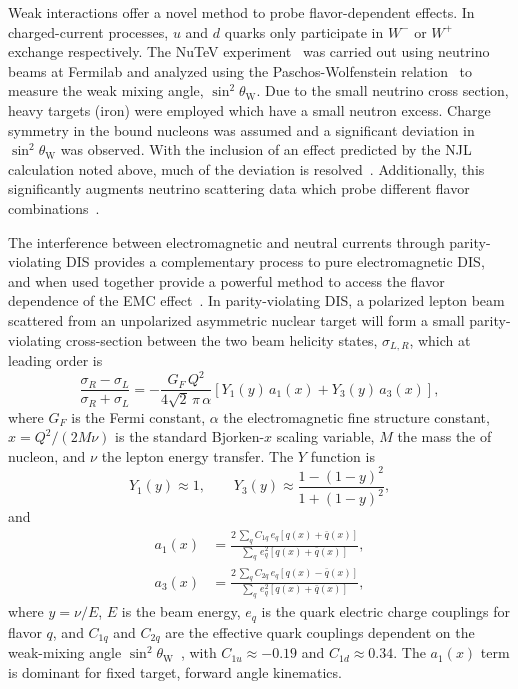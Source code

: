 Weak interactions offer a novel method to probe flavor-dependent effects.  In charged-current processes, $u$ and $d$ quarks only participate in $W^-$ or $W^+$ exchange respectively. The NuTeV experiment~\cite{Zeller:2001hh} was carried out using neutrino beams at Fermilab and analyzed using the Paschos-Wolfenstein relation~\cite{Paschos:1972kj} to measure the weak mixing angle, $\sin^2\theta_\mathrm{W}$.  Due to the small neutrino cross section, heavy targets (iron) were employed which have a small neutron excess.  Charge symmetry in the bound nucleons was assumed and a significant deviation in $\sin^2\theta_\mathrm{W}$ was observed.  With the inclusion of an effect predicted by the NJL calculation noted above, much of the deviation is resolved~\cite{Cloet:2009qs,Bentz:2009yy}.  Additionally, this significantly augments neutrino scattering data which probe different flavor combinations~\cite{Schienbein:2009kk}.

%
The interference between electromagnetic and neutral currents through parity-violating DIS provides a complementary process to pure electromagnetic DIS, and when used together provide a powerful method to access the flavor dependence of the EMC effect~\cite{Cloet:2012td}. In parity-violating DIS, a polarized lepton beam scattered from an unpolarized asymmetric nuclear target will form a small parity-violating cross-section between the two beam helicity states, $\sigma_{L,R}$, which at leading order is 
%
\begin{equation}
\frac{ \sigma_R - \sigma_L }{\sigma_R + \sigma_L} = -\frac{G_F\,Q^2}{4 \sqrt{2}\, \pi\, \alpha} 
\left[ Y_1(y)\,a_1(x) + Y_3(y)\,a_3(x) \right],
\label{eq:phy:apv}
\end{equation}
%
where $G_F$ is the Fermi constant, $\alpha$ the electromagnetic fine structure constant, $x = Q^2/(2M\nu)$ is the standard Bjorken-$x$ scaling variable, $M$ the mass the of nucleon, and $\nu$ the lepton energy transfer.  The $Y$ function is
%
\begin{equation}
Y_1(y) \approx 1, \qquad Y_3(y) \approx \frac{1 - (1-y)^2}{1 + (1-y)^2},
\end{equation}
%
and
%
\begin{align}
a_1(x) &= \frac{2\,\sum_q C_{1q}\, e_q\left[q(x) + \bar{q}(x)\right]}
{\sum_q\, e_q^2\left[q(x) + \bar{q}(x)\right]}, \\
a_3(x) &= \frac{2\,\sum_q C_{2q}\, e_q\left[q(x) - \bar{q}(x)\right]}
{\sum_q\, e_q^2\left[q(x) + \bar{q}(x)\right]},
\end{align}
%
where $y=\nu/E$, $E$ is the beam energy, $e_q$ is the quark electric charge couplings for flavor $q$, and $C_{1q}$ and $C_{2q}$ are the effective quark couplings dependent on the weak-mixing angle $\sin^2\theta_\mathrm{W}$~\cite{Patrignani:2016xqp}, with $C_{1u} \approx -0.19$ and $C_{1d} \approx 0.34$. The $a_1(x)$ term is dominant for fixed target, forward angle kinematics. 

